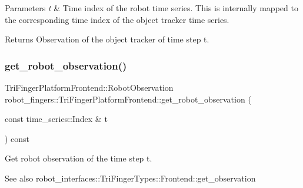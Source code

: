 \begin{DoxyParams}{Parameters}
{\em t} & Time index of the robot time series. This is internally mapped to the corresponding time index of the object tracker time series.\\
\hline
\end{DoxyParams}
\begin{DoxyReturn}{Returns}
Observation of the object tracker of time step t. 
\end{DoxyReturn}
\mbox{\label{classrobot__fingers_1_1TriFingerPlatformFrontend_a86149ce45a4ddada714eb0e0fde20e66}} 
\subsubsection{\texorpdfstring{get\+\_\+robot\+\_\+observation()}{get\_robot\_observation()}}
{\footnotesize\ttfamily Tri\+Finger\+Platform\+Frontend\+::\+Robot\+Observation robot\+\_\+fingers\+::\+Tri\+Finger\+Platform\+Frontend\+::get\+\_\+robot\+\_\+observation (\begin{DoxyParamCaption}\item[{const time\+\_\+series\+::\+Index \&}]{t }\end{DoxyParamCaption}) const}



Get robot observation of the time step t. 

\begin{DoxySeeAlso}{See also}
robot\+\_\+interfaces\+::\+Tri\+Finger\+Types\+::\+Frontend\+::get\+\_\+observation 
\end{DoxySeeAlso}
\mbox{\label{classrobot__fingers_1_1TriFingerPlatformFrontend_afc30cd1aecd9967045a0365c21f964fe}} 
